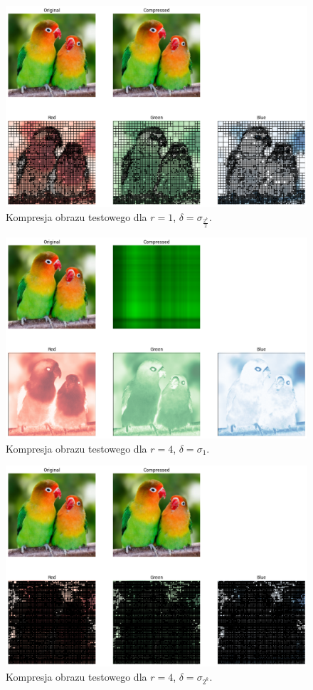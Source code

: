 \documentclass[11pt, leqno]{scrartcl}
\begin{document}
    \begin{figure}[H]
        \centering
        \includegraphics[width=0.9\linewidth]{r1sigma05k.png}
        \caption{Kompresja obrazu testowego dla $r=1$, $\delta =\sigma_\frac{2^k}{2}$.}
    \end{figure}
    \begin{figure}[H]
        \centering
        \includegraphics[width=0.9\linewidth]{r4sigma1.png}
        \caption{Kompresja obrazu testowego dla $r=4$, $\delta =\sigma_1$.}
    \end{figure}
    \begin{figure}[H]
        \centering
        \includegraphics[width=0.9\linewidth]{r4sigma2k.png}
        \caption{Kompresja obrazu testowego dla $r=4$, $\delta =\sigma_{2^k}$.}
    \end{figure}
\end{document}
